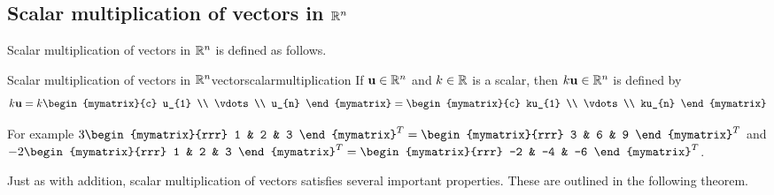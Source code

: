 \subsection{Scalar multiplication of vectors in \texorpdfstring{$\mathbb{R}^n$}{Rn}}

Scalar multiplication of vectors in $\mathbb{R}^n$ is defined as 
follows.

\begin{definition}{Scalar multiplication of vectors in $\mathbb{R}^n$}{vectorscalarmultiplication}
If ${\bf u}\in \mathbb{R}^{n}$ and $k\in \mathbb{R}$ is a
scalar, then $k{\bf u}\in \mathbb{R}^{n}$ is defined by
\begin{equation*}
k\vect{u}=k\begin{mymatrix}{c}
u_{1} \\
\vdots \\
u_{n}
\end{mymatrix} = \begin{mymatrix}{c}
ku_{1} \\
\vdots \\
ku_{n}
\end{mymatrix}
\end{equation*}
\end{definition}

For example 
$3 \begin{mymatrix}{rrr}
1 & 2 & 3
\end{mymatrix}^T =
\begin{mymatrix}{rrr}
3 & 6 & 9
\end{mymatrix}^T$
 and 
$-2\begin{mymatrix}{rrr}
1 & 2 & 3
\end{mymatrix}^T
=
\begin{mymatrix}{rrr}
-2 & -4 & -6
\end{mymatrix}^T$.

Just as with addition, scalar multiplication of vectors satisfies several important properties. These are 
outlined in the following theorem. 

